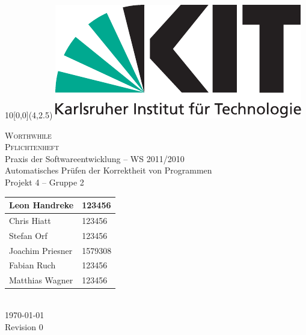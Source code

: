 
\newcommand{\diameter}{20}
\newcommand{\xone}{-15}
\newcommand{\xtwo}{160}
\newcommand{\yone}{15}
\newcommand{\ytwo}{-253}

\begin{titlepage}
	\begin{textblock}{10}[0,0](4,2.5)
		\includegraphics[width=.3\textwidth]{images/kit_logo_de_4c_positiv.pdf}
	\end{textblock}
	\vspace*{3.5cm}
	\begin{center}
		\fontsize{45}{50}\selectfont
  \textsc{Worthwhile} \\
  \textsc{Pflichtenheft}
		\vspace*{2cm}\\
		\LARGE
  Praxis der Softwareentwicklung -- WS 2011/2010 \\
  Automatisches Prüfen der Korrektheit von Programmen \\
  Projekt 4 -- Gruppe 2 \\
  \medskip
  \vspace*{2cm}
  \Large
  \begin{tabular}{|l|l|}
    \hline
    Leon Handreke & 123456 \\
    \hline
    Chris Hiatt & 123456 \\
    \hline
    Stefan Orf & 123456 \\
    \hline
    Joachim Priesner & 1579308 \\
    \hline
    Fabian Ruch & 123456 \\
    \hline
    Matthias Wagner & 123456 \\
    \hline
  \end{tabular}
  \vspace*{2cm} \\
  \today \\
	Revision 0
	\end{center}
	\vspace*{1cm}


\end{titlepage}
